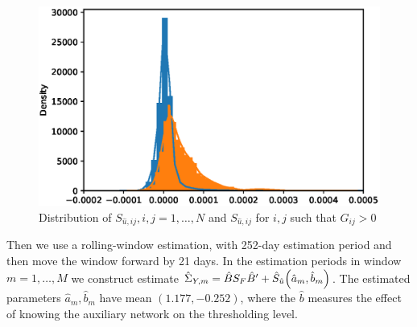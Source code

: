 \begin{figure}[htbp]
    \centering
    \includegraphics{fig/fig1.eps}
    \caption{Distribution of \(S_{\hat{u},ij}, i,j = 1,\dots,N\) and \(S_{\hat{u},ij}\) for \(i,j\) such that \(G_{ij} >0\) }
    \label{<label>}
\end{figure}

Then we use a rolling-window estimation, with 252-day estimation period and then move the window forward by 21 days. In the estimation periods in window  \(m= 1, \dots,M\) we construct estimate \(\hat{\Sigma}_{Y,m} = \hat{B}S_{F}\hat{B}' + \hat{S}_{\hat{u}}\pqty{\hat{a}_{m}, \hat{b}_{m}}\). The estimated parameters \(\hat{a}_{m},\hat{b}_{m} \)  have mean \((1.177, -0.252)\), where the \(\hat{b}\) measures the effect of knowing the auxiliary network on the thresholding level. 
